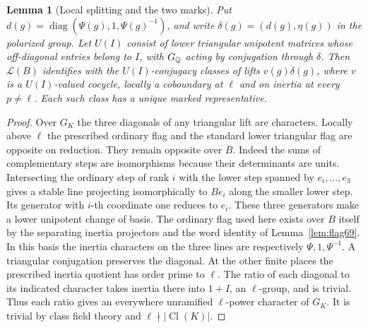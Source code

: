 \documentclass[a4paper,11pt]{article}
\newtheorem{lemma}[proposition]{Lemma}
\theoremstyle{definition}
\theoremstyle{remark}
\numberwithin{equation}{section}
\begin{document}
\begin{lemma}[Local splitting and the two marks]\label{lem:triangularmark384}
Put \(d(g)=\operatorname{diag}(\Psi(g),1,\Psi(g)^{-1})\), and
write \(\delta(g)=(d(g),\eta(g))\) in the polarized group. Let
\(U(I)\) consist of lower triangular unipotent matrices whose
off-diagonal entries belong to \(I\), with \(G_\mathbb Q\) acting by
conjugation through \(\delta\). Then \(\mathcal L(B)\) identifies
with the \(U(I)\)-conjugacy classes of lifts \(v(g)\delta(g)\),
where \(v\) is a \(U(I)\)-valued cocycle, locally a coboundary
at \(\ell\) and on inertia at every \(p\ne\ell\). Each such class
has a unique marked representative.
\end{lemma}
\begin{proof}
Over \(G_K\) the three diagonals of any triangular lift are
characters. Locally above \(\ell\) the prescribed ordinary flag
and the standard lower triangular flag are opposite on reduction.
They remain opposite over \(B\). Indeed the sums of complementary
steps are isomorphisms because their determinants are units.
Intersecting the ordinary step of rank \(i\) with the lower step
spanned by \(e_i,\ldots,e_3\) gives a stable line projecting
isomorphically to \(B e_i\) along the smaller lower step.
Its generator with \(i\)-th coordinate one reduces to \(e_i\).
These three generators make a lower unipotent change of basis.
The ordinary flag used here exists over \(B\) itself by the
separating inertia projectors and the word identity of
Lemma~\ref{lem:flag69}. In this basis the inertia characters on
the three lines are respectively \(\Psi,1,\Psi^{-1}\).
A triangular conjugation preserves the diagonal. At the other
finite places the prescribed inertia quotient has order prime
to \(\ell\). The ratio of each diagonal to its indicated
character takes inertia there into \(1+I\), an \(\ell\)-group,
and is trivial. Thus each ratio gives an everywhere unramified
\(\ell\)-power character of \(G_K\). It is trivial by class
field theory and \(\ell\nmid|\operatorname{Cl}(K)|\).


\end{proof}
\end{document}
